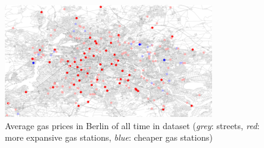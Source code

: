 \begin{figure}
  \centering
    \includegraphics[width=0.8\textwidth
    ]{img/berlin_avg_gas_station_price.png}
     \caption{Average gas prices in Berlin of all time in dataset (\textit{grey}: streets, \textit{red}: more expansive gas stations, \textit{blue}: cheaper gas stations)}
     \label{fig:berlin-map}
\end{figure}